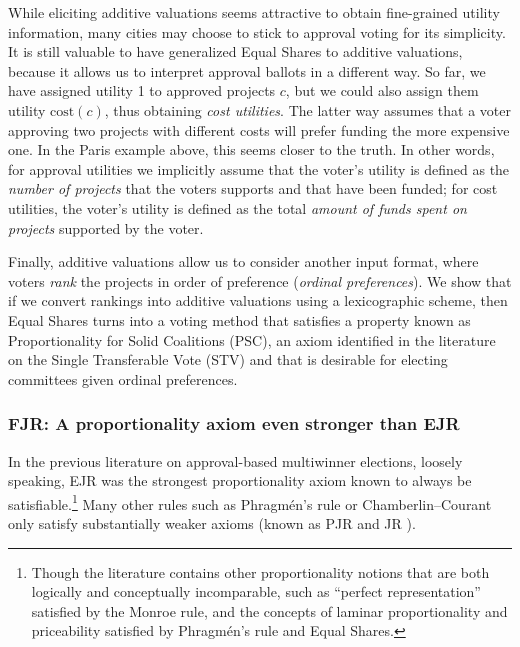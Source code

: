 \documentclass[10pt]{scrartcl}
\newcommand{\myemph}[1]{{\color{winered}\emph{#1}}}
\newcommand{\cost}{{{\mathrm{cost}}}}
\theoremstyle{definition}
\theoremstyle{plain}
\begin{document}
While eliciting additive valuations seems attractive to obtain fine-grained utility information, many cities may choose to stick to approval voting for its simplicity. It is still valuable to have generalized Equal Shares to additive valuations, because it allows us to interpret approval ballots in a different way. So far, we have assigned utility 1 to approved projects $c$, but we could also assign them utility $\cost(c)$, thus obtaining \emph{cost utilities}. The latter way assumes that a voter approving two projects with different costs will prefer funding the more expensive one. In the Paris example above, this seems closer to the truth. In other words, for approval utilities we implicitly assume that the voter's utility is defined as the \myemph{number of projects} that the voters supports and that have been funded; for cost utilities, the voter's utility is defined as the total \myemph{amount of funds spent on projects} supported by the voter.

Finally, additive valuations allow us to consider another input format, where voters \emph{rank} the projects in order of preference (\emph{ordinal preferences}). We show that if we convert rankings into additive valuations using a lexicographic scheme, then Equal Shares turns into a voting method that satisfies a property known as Proportionality for Solid Coalitions (PSC), an axiom identified in the literature on the Single Transferable Vote (STV) \citep{woo:j:properties,tid-ric:j:stv,az-bar:expanding_approval} and that is desirable for electing committees given ordinal preferences. 



\subsubsection*{FJR: A proportionality axiom even stronger than EJR}

In the previous literature on approval-based multiwinner elections, loosely speaking, EJR was the strongest proportionality axiom known to always be satisfiable.\footnote{Though the literature contains other proportionality notions that are both logically and conceptually incomparable, such as ``perfect representation'' \citep{pjr17} satisfied by the Monroe rule, and the concepts of laminar proportionality and priceability \citep{pet-sko:laminar} satisfied by Phragm\'en's rule and Equal Shares.}
Many other rules such as Phragm\'en's rule or Chamberlin--Courant only satisfy substantially weaker axioms (known as PJR \citep{pjr17} and JR \citep{justifiedRepresentation}).
\end{document}
